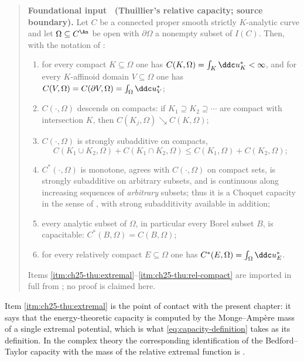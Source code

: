 \label{thm:ch25-thuillier-capacity}
\begin{quote}
\textbf{Foundational input \thetheorem\ (Thuillier's relative capacity;
source boundary).}
Let $C$ be a connected proper smooth strictly $K$-analytic curve and let
$\Omega\subseteq C^{\An}$ be open with $\partial\Omega$ a nonempty
subset of $I(C)$.  Then, with the notation of
:
\begin{enumerate}
\item\label{itm:ch25-thu:extremal}
 for every compact $K\subseteq\Omega$ one has
 $C(K,\Omega)=\int_K\ddc u^*_K<\infty$, and for every $K$-affinoid
 domain $V\subseteq\Omega$ one has
 $C(V,\Omega)=C(\partial V,\Omega)=\int_\Omega\ddc u^*_V$;
\item\label{itm:ch25-thu:descend}
 $C(\cdot,\Omega)$ descends on compacts: if $K_1\supseteq K_2\supseteq
 \cdots$ are compact with intersection $K$, then
 $C(K_j,\Omega)\searrow C(K,\Omega)$;
\item\label{itm:ch25-thu:strong}
 $C(\cdot,\Omega)$ is strongly subadditive on compacts,
 \[
  C(K_1\cup K_2,\Omega)+C(K_1\cap K_2,\Omega)
  \leq C(K_1,\Omega)+C(K_2,\Omega);
 \]
\item\label{itm:ch25-thu:outer}
 $C^*(\cdot,\Omega)$ is monotone, agrees with $C(\cdot,\Omega)$ on
 compact sets, is strongly subadditive on arbitrary subsets, and is
 continuous along increasing sequences of \emph{arbitrary} subsets; thus it
 is a Choquet capacity in the sense of , with
 strong subadditivity available in addition;
\item\label{itm:ch25-thu:capacitable}
 every analytic subset of $\Omega$, in particular every Borel subset
 $B$, is capacitable: $C^*(B,\Omega)=C(B,\Omega)$;
\item\label{itm:ch25-thu:rel-compact}
 for every relatively compact $E\subseteq\Omega$ one has
 $C^*(E,\Omega)=\int_\Omega\ddc u^*_E$.
\end{enumerate}
Items \cref{itm:ch25-thu:extremal}--\cref{itm:ch25-thu:rel-compact} are
imported in full from \cite[Propositions~3.6.3, 3.6.5, 3.6.6, 3.6.8,
3.6.10 and Th\'eor\`eme~3.6.9]{Thu05}; no proof is claimed here.
\end{quote}

Item \cref{itm:ch25-thu:extremal} is the point of contact with the present
chapter: it says that the energy-theoretic capacity is computed by the
Monge--Amp\`ere mass of a single extremal potential, which is what
\eqref{eq:capacity-definition} takes as its definition.  In the complex
theory the corresponding identification of the Bedford--Taylor capacity with
the mass of the relative extremal function is \cite[Proposition~4.2]{BT82}.

